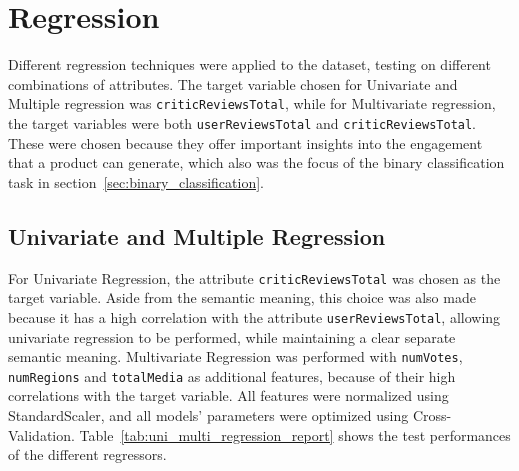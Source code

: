 \chapter{Regression}
\label{ch:capitolo4}
Different regression techniques were applied to the dataset, testing
on different combinations of attributes. The target variable chosen for
Univariate and Multiple regression was \texttt{criticReviewsTotal}, while
for Multivariate regression, the target variables were both
\texttt{userReviewsTotal} and \texttt{criticReviewsTotal}.
These were chosen because they offer important insights into the engagement
that a product can generate, which also was the focus of the binary
classification task in section~\ref{sec:binary_classification}.


\section{Univariate and Multiple Regression}
For Univariate Regression, the attribute
\texttt{criticReviewsTotal} was chosen
as the target variable. Aside from the semantic meaning, this choice was also made
because it has a high correlation
with the attribute \texttt{userReviewsTotal}, allowing univariate regression
to be performed, while maintaining a clear separate semantic meaning.
Multivariate Regression was performed with \texttt{numVotes}, \texttt{numRegions} and
\texttt{totalMedia} as additional features, because of their high correlations with the target variable.
All features were normalized using StandardScaler, and all models' parameters
were optimized using Cross-Validation.
Table~\ref{tab:uni_multi_regression_report} shows the test performances of the different regressors.
